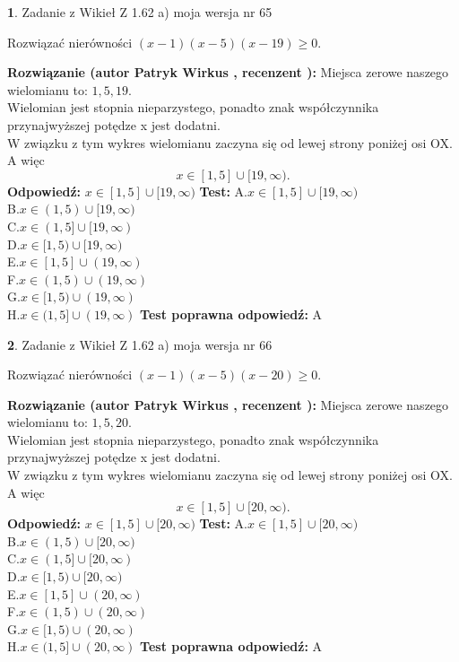 \documentclass[12pt, a4paper]{article}
\theoremstyle{definition} %
\newtheorem{zad}{}
\newcommand{\zadStart}[1]{\begin{zad}#1\newline}
\newcommand{\zadStop}{\end{zad}}
\newcommand{\rozwStart}[2]{\noindent \textbf{Rozwiązanie (autor #1 , recenzent #2): }\newline}
\newcommand{\rozwStop}{\newline}
\newcommand{\odpStart}{\noindent \textbf{Odpowiedź:}\newline}
\newcommand{\odpStop}{\newline}
\newcommand{\testStart}{\noindent \textbf{Test:}\newline}
\newcommand{\testStop}{\newline}
\newcommand{\kluczStart}{\noindent \textbf{Test poprawna odpowiedź:}\newline}
\newcommand{\kluczStop}{\newline}
\begin{document}
\zadStart{Zadanie z Wikieł Z 1.62 a) moja wersja nr 65}

Rozwiązać nierówności $(x-1)(x-5)(x-19)\ge0$.
\zadStop
\rozwStart{Patryk Wirkus}{}
Miejsca zerowe naszego wielomianu to: $1, 5, 19$.\\
Wielomian jest stopnia nieparzystego, ponadto znak współczynnika przy\linebreak najwyższej potędze x jest dodatni.\\ W związku z tym wykres wielomianu zaczyna się od lewej strony poniżej osi OX. A więc $$x \in [1,5] \cup [19,\infty).$$
\rozwStop
\odpStart
$x \in [1,5] \cup [19,\infty)$
\odpStop
\testStart
A.$x \in [1,5] \cup [19,\infty)$\\
B.$x \in (1,5) \cup [19,\infty)$\\
C.$x \in (1,5] \cup [19,\infty)$\\
D.$x \in [1,5) \cup [19,\infty)$\\
E.$x \in [1,5] \cup (19,\infty)$\\
F.$x \in (1,5) \cup (19,\infty)$\\
G.$x \in [1,5) \cup (19,\infty)$\\
H.$x \in (1,5] \cup (19,\infty)$
\testStop
\kluczStart
A
\kluczStop



\zadStart{Zadanie z Wikieł Z 1.62 a) moja wersja nr 66}

Rozwiązać nierówności $(x-1)(x-5)(x-20)\ge0$.
\zadStop
\rozwStart{Patryk Wirkus}{}
Miejsca zerowe naszego wielomianu to: $1, 5, 20$.\\
Wielomian jest stopnia nieparzystego, ponadto znak współczynnika przy\linebreak najwyższej potędze x jest dodatni.\\ W związku z tym wykres wielomianu zaczyna się od lewej strony poniżej osi OX. A więc $$x \in [1,5] \cup [20,\infty).$$
\rozwStop
\odpStart
$x \in [1,5] \cup [20,\infty)$
\odpStop
\testStart
A.$x \in [1,5] \cup [20,\infty)$\\
B.$x \in (1,5) \cup [20,\infty)$\\
C.$x \in (1,5] \cup [20,\infty)$\\
D.$x \in [1,5) \cup [20,\infty)$\\
E.$x \in [1,5] \cup (20,\infty)$\\
F.$x \in (1,5) \cup (20,\infty)$\\
G.$x \in [1,5) \cup (20,\infty)$\\
H.$x \in (1,5] \cup (20,\infty)$
\testStop
\kluczStart
A
\kluczStop
\end{document}
